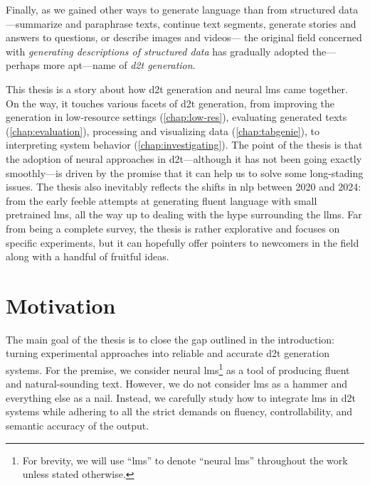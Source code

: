 Finally, as we gained other ways to generate language than from structured data---summarize and paraphrase texts, continue text segments, generate stories and answers to questions, or describe images and videos---%
the original field concerned with \textit{generating descriptions of structured data} has gradually adopted the---perhaps more apt---name of \emph{\ac{d2t} generation}.

This thesis is a story about how \acl{d2t} generation and neural \aclp{lm} came together. On the way, it touches various facets of \ac{d2t} generation, from improving the generation in low-resource settings (\autoref{chap:low-res}), evaluating generated texts (\autoref{chap:evaluation}), processing and visualizing data (\autoref{chap:tabgenie}), to interpreting system behavior (\autoref{chap:investigating}). The point of the thesis is that the adoption of neural approaches in \ac{d2t}---although it has not been going exactly smoothly---is driven by the promise that it can help us to solve some long-stading issues. The thesis also inevitably reflects the shifts in \ac{nlp} between 2020 and 2024: from the early feeble attempts at generating fluent language with small pretrained \acp{lm}, all the way up to dealing with the hype surrounding the \acp{llm}.  Far from being a complete survey, the thesis is rather explorative and focuses on specific experiments, but it can hopefully offer pointers to newcomers in the field along with a handful of fruitful ideas.










\section{Motivation}
\label{sec:rq}

The main goal of the thesis is to close the gap outlined in the introduction: turning experimental approaches into reliable and accurate \ac{d2t} generation systems. For the premise, we consider neural \acp{lm}\footnote{For brevity, we will use ``\acp{lm}'' to denote ``neural \acp{lm}'' throughout the work unless stated otherwise.} as a tool of producing fluent and natural-sounding text.
However, we do not consider \acp{lm} as a hammer and everything else as a nail. Instead, we carefully study how to integrate \acp{lm} in \ac{d2t} systems while adhering to all the strict demands on fluency, controllability, and semantic accuracy of the output.

